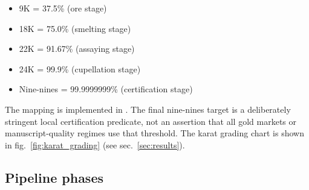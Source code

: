\documentclass[
]{article}
\providecommand{\tightlist}{%
  \setlength{\itemsep}{0pt}\setlength{\parskip}{0pt}}
\begin{document}
\begin{itemize}
\tightlist
\item
  9K = 37.5\% (ore stage)
\item
  18K = 75.0\% (smelting stage)
\item
  22K = 91.67\% (assaying stage)
\item
  24K = 99.9\% (cupellation stage)
\item
  Nine-nines = 99.9999999\% (certification stage)
\end{itemize}

The mapping is implemented in
. The final nine-nines
target is a deliberately stringent local certification predicate, not an
assertion that all gold markets or manuscript-quality regimes use that
threshold. The karat grading chart is shown in
fig.~\ref{fig:karat_grading} (see sec.~\ref{sec:results}).

\subsection{Pipeline phases}\label{pipeline-phases}
\end{document}
